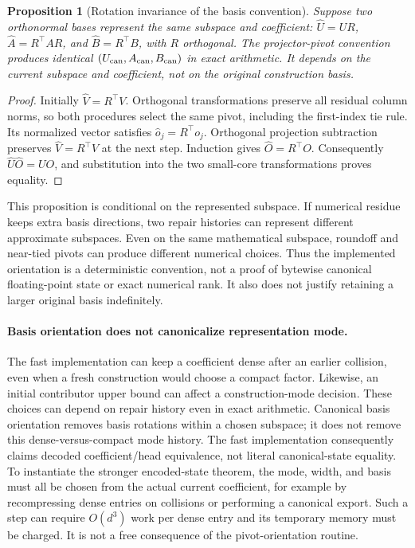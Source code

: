 \documentclass[11pt,a4paper]{article}
\newtheorem{proposition}[theorem]{Proposition}
\begin{document}
\begin{proposition}[Rotation invariance of the basis convention]
Suppose two orthonormal bases represent the same subspace and coefficient:
$\widehat U=UR$, $\widehat A=R^\top AR$, and
$\widehat B=R^\top B$, with $R$ orthogonal. The projector-pivot convention
produces identical $(U_{\rm can},A_{\rm can},B_{\rm can})$ in exact
arithmetic. It depends on the current subspace and coefficient, not on
the original construction basis.
\end{proposition}
\begin{proof}
Initially $\widehat V=R^\top V$. Orthogonal transformations preserve all
residual column norms, so both procedures select the same pivot, including
the first-index tie rule. Its normalized vector satisfies
$\widehat o_j=R^\top o_j$. Orthogonal projection subtraction preserves
$\widehat V=R^\top V$ at the next step. Induction gives
$\widehat O=R^\top O$. Consequently $\widehat U\widehat O=UO$, and
substitution into the two small-core transformations proves equality.
\end{proof}

This proposition is conditional on the represented subspace. If numerical
residue keeps extra basis directions, two repair histories can represent
different approximate subspaces. Even on the same mathematical subspace,
roundoff and near-tied pivots can produce different numerical choices.
Thus the implemented orientation is a deterministic convention, not a
proof of bytewise canonical floating-point state or exact numerical rank.
It also does not justify retaining a larger original basis indefinitely.

\paragraph{Basis orientation does not canonicalize representation mode.}
The fast implementation can keep a coefficient dense after an earlier
collision, even when a fresh construction would choose a compact factor.
Likewise, an initial contributor upper bound can affect a construction-mode
decision. These choices can depend on repair history even in exact
arithmetic. Canonical basis orientation removes basis rotations within a
chosen subspace; it does not remove this dense-versus-compact mode history.
The fast implementation consequently claims decoded coefficient/head
equivalence, not literal canonical-state equality. To instantiate the
stronger encoded-state theorem, the mode, width, and basis must all be
chosen from the actual current coefficient, for example by recompressing
dense entries on collisions or performing a canonical export. Such a step
can require $O(d^3)$ work per dense entry and its temporary memory must be
charged. It is not a free consequence of the pivot-orientation routine.
\end{document}
